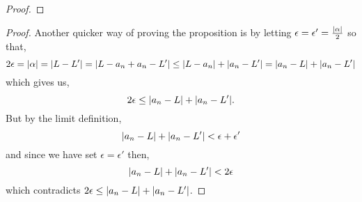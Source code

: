 \documentclass[MathsNotesBase.tex]{subfiles}
\begin{document}
{\begin{proof}
		\end{proof}
		\begin{proof}
			Another quicker way of proving the proposition is by letting $ \epsilon = \epsilon' = \frac{\lvert\alpha\rvert}{2} $ so that,
			\[ 2\epsilon = \lvert\alpha\rvert = \lvert L - L'\rvert = \lvert L - a_n + a_n - L'\rvert \leq \lvert L - a_n\rvert + \lvert a_n - L'\rvert = \lvert a_n - L\rvert + \lvert a_n - L'\rvert \]
			which gives us,
			\[ 2\epsilon \leq \lvert a_n - L\rvert + \lvert a_n - L'\rvert. \]
			But by the limit definition,
			\[ \lvert a_n - L\rvert + \lvert a_n - L'\rvert < \epsilon + \epsilon' \]
			and since we have set $ \epsilon = \epsilon' $ then,
			\[ \lvert a_n - L\rvert + \lvert a_n - L'\rvert < 2\epsilon \]
			which contradicts $ 2\epsilon \leq \lvert a_n - L\rvert + \lvert a_n - L'\rvert $.
		\end{proof}
	
		\bigskip\bigskip
		
}
\end{document}
